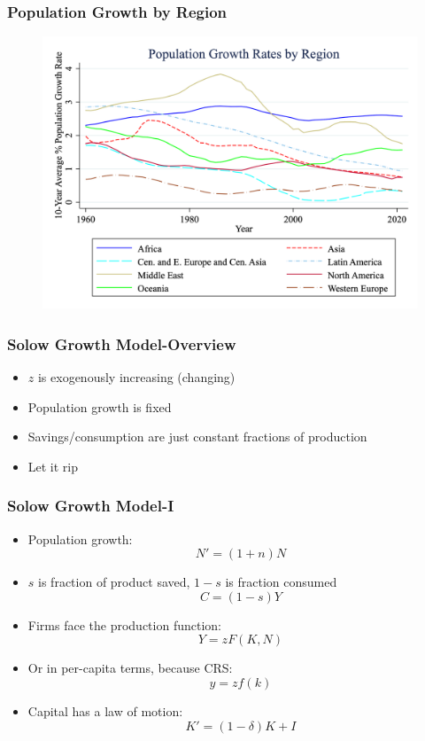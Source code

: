 \documentclass{beamer}
\begin{document}
\begin{frame}
\frametitle[alignment=center]{Population Growth by Region}
\begin{figure}
\centering
\includegraphics[scale=0.25]{Figures/PopGrowth_region.png}
\end{figure}
\end{frame}

\begin{frame}
\frametitle[alignment=center]{Solow Growth Model-Overview}
\begin{itemize}
\item $z$ is exogenously increasing (changing)
\bigskip
\item Population growth is fixed
\bigskip
\item Savings/consumption are just constant fractions of production  
\bigskip
\item Let it rip
\end{itemize}
\end{frame}


\begin{frame}
\frametitle[alignment=center]{Solow Growth Model-I}
\begin{itemize}
\item Population growth:
$$N'=(1+n)N$$
\item $s$ is fraction of product saved, $1-s$ is fraction consumed
$$C=(1-s)Y$$
\bigskip
\item Firms face the production function:
$$Y=zF(K,N)$$
\item Or in per-capita terms, because CRS:
$$y=zf(k)$$
\item Capital has a law of motion:
$$K'=(1-\delta)K+I$$\end{itemize}
\end{frame}
\end{document}
